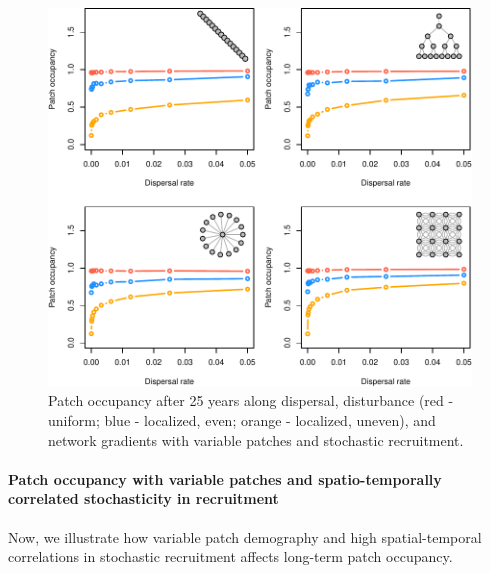 \documentclass[
]{article}
\begin{document}
\begin{figure}[H]

{\centering \includegraphics{Managing_for_ecological_surprises_in_metapopulations_files/figure-latex/patch occupancy with variable patches and stochasticity-1} 

}

\caption{Patch occupancy after 25 years along dispersal, disturbance (red - uniform; blue - localized, even; orange - localized, uneven), and network gradients with variable patches and stochastic recruitment.}\label{fig:patch occupancy with variable patches and stochasticity}
\end{figure}

\newpage

\hypertarget{patch-occupancy-with-variable-patches-and-spatio-temporally-correlated-stochasticity-in-recruitment}{%
\paragraph{Patch occupancy with variable patches and spatio-temporally
correlated stochasticity in
recruitment}\label{patch-occupancy-with-variable-patches-and-spatio-temporally-correlated-stochasticity-in-recruitment}}

Now, we illustrate how variable patch demography and high
spatial-temporal correlations in stochastic recruitment affects
long-term patch occupancy.
\end{document}

